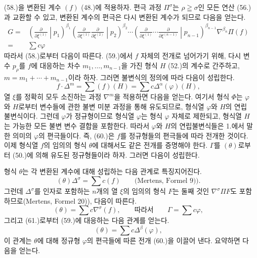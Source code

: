 (58.)을 변환된 계수 $(f)$ (48.)에 적용하자. 편극 과정 $\Pi^\sigma$는 $\rho\geqq\sigma$인 모든 연산 (56.)과 교환할 수 있고, 변환된 계수의 편극은 다시 변환된 계수가 되므로 다음을 얻는다.
\[
\begin{aligned}
 G={}&\left(\frac{\partial}{\partial\xi^{(1)}}\middle|p_1\right)^{\beta_1}
 \left(\frac{\partial}{\partial\xi^{(1)}}\frac{\partial}{\partial\xi^{(2)}}\middle|p_2\right)^{\beta_2}
 \cdots
 \left(\frac{\partial}{\partial\xi^{(1)}}\cdots\frac{\partial}{\partial\xi^{(n-1)}}\middle|p_{n-1}\right)^{\beta_{n-1}}
 \nabla^{\beta_n}\Pi(f)\\
 ={}&\sum c\varphi
\end{aligned}
\]
따라서 (58.)로부터 다음이 따른다.
(59.)에서 $f$ 자체의 전개로 넘어가기 위해, 다시 변수 $p_\rho$를 $f$에 대응하는 차수 $m_1,\ldots,m_{n-1}$을 가진 형식 $H$ (52.)의 계수로 간주하고, $m=m_1+\cdots+m_{n-1}$이라 하자. 그러면 불변식의 정의에 따라 다음이 성립한다.
\[
 f\cdot\Delta^m=\sum(f)(H)=\sum c\Delta^\alpha(\varphi)(H),
\]
열 $\xi$를 정확히 모두 소진하는 과정 $\nabla^m$을 적용하면 다음을 얻는다.
여기서 형식 $\Phi$는 $\varphi$와 $H$로부터 변수들에 관한 불변 미분 과정을 통해 유도되므로, 형식열 $\varphi$와 $H$의 연립불변식이다. 그런데 $\varphi$가 정규형이므로 형식열 $\varphi$는 형식 $\varphi$ 자체로 제한되고, 형식열 $H$는 가능한 모든 불변 변수 결합을 포함한다. 따라서 $\varphi$와 $H$의 연립불변식들은 1.에서 말한 의미의 $\varphi$의 편극들이다. 즉, (60.)은 $f$를 정규형들의 편극들에 따라 전개한 것이다. 이제 형식열 $f$의 임의의 형식 $\theta$에 대해서도 같은 전개를 증명해야 한다. $\Gamma$를 $(\theta)$로부터 (50.)에 의해 유도된 정규형들이라 하자. 그러면 다음이 성립한다.

형식 $\theta$는 각 변환된 계수에 대해 성립하는 다음 관계로 특징지어진다.
\[
 (\theta)\Delta^\sigma=\sum c(f)\qquad\text{(Mertens, Formel 9)).}
\]
그런데 $\Delta^\sigma$를 인자로 포함하는 $n$개의 열 $\xi$의 임의의 형식 $F$는 둘째 것인 $\nabla^\sigma\Pi F$도 포함하므로(Mertens, Formel 20)), 다음이 따른다.
\[
 (\theta)=\sum c\nabla^\sigma(f),\qquad\text{따라서}\qquad \Gamma=\sum c\varphi,
\]
그리고 (61.)로부터 (59.)에 대응하는 다음 관계를 얻는다.
\[
 (\theta)=\sum c\Delta^\beta(\varphi),
\]
이 관계는 $\theta$에 대해 정규형 $\varphi$의 편극들에 따른 전개 (60.)을 이끌어 낸다. 요약하면 다음을 얻는다.

